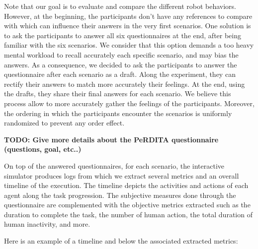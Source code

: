 Note that our goal is to evaluate and compare the different robot behaviors. However, at the beginning, the participants don't have any references to compare with which can influence their answers in the very first scenarios. One solution is to ask the participants to answer all six questionnaires at the end, after being familiar with the six scenarios. We consider that this option demands a too heavy mental workload to recall accurately each specific scenario, and may bias the answers. As a consequence, we decided to ask the participants to answer the questionnaire after each scenario as a draft. Along the experiment, they can rectify their answers to match more accurately their feelings. At the end, using the drafts, they share their final answers for each scenario. We believe this process allow to more accurately gather the feelings of the participants. Moreover, the ordering in which the participants encounter the scenarios is uniformly randomized to prevent any order effect. 

\textbf{TODO: Give more details about the PeRDITA questionnaire (questions, goal, etc..)}

On top of the answered questionnaires, for each scenario, the interactive simulator produces logs from which we extract several metrics and an overall timeline of the execution. The timeline depicts the activities and actions of each agent along the task progression. The subjective measures done through the questionnaire are complemented with the objective metrics extracted such as the duration to complete the task, the number of human action, the total duration of human inactivity, and more. 

Here is an example of a timeline and below the associated extracted metrics:

